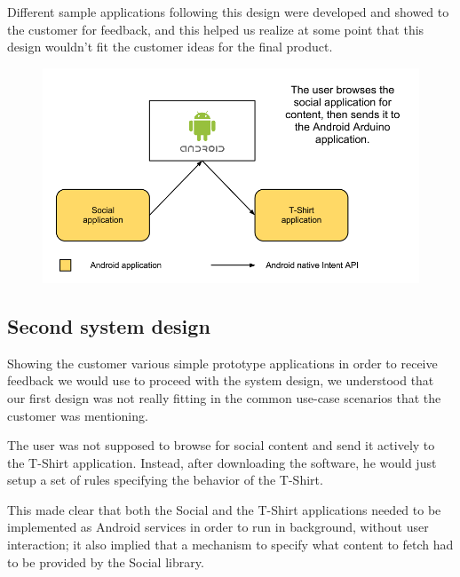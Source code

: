 Different sample applications following this design were developed and showed to the
customer for feedback, and this helped us realize at some point that this design wouldn't fit
the customer ideas for the final product.

\begin{figure}[h!]
\centering \includegraphics[scale=0.35]{img/architecture-resp.png}
\caption{}
\label{fig:resp}
\end{figure}

\subsection{Second system design}
Showing the customer various simple prototype applications in order to receive feedback we would use
to proceed with the system design, we understood that our first design was not really fitting in the
common use-case scenarios that the customer was mentioning.

The user was not supposed to browse for social content and send it actively to the T-Shirt application.
Instead, after downloading the software, he would just setup a set of rules specifying the behavior of the T-Shirt.

This made clear that both the Social and the T-Shirt applications needed to be implemented
as Android services in order to run in background, without user interaction; it also implied 
that a mechanism to specify what content to fetch had to be provided by the Social library.

